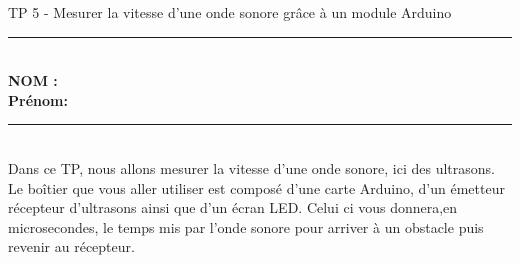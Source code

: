 \documentclass[11pt,a4paper]{article}
\begin{document}
\center \LARGE{TP 5 - Mesurer la vitesse d'une onde sonore grâce à un module Arduino}
\\[0,3cm]

\normalsize

\hrule\
\\[0,2cm]

\flushleft \textbf{NOM :\\
Prénom:\\[0,2cm]
}
\hrule\
\\[0,2cm]

Dans ce TP, nous allons mesurer la vitesse d'une onde sonore, ici des ultrasons. Le boîtier que vous aller utiliser est composé d'une carte Arduino, d'un émetteur récepteur d'ultrasons ainsi que d'un écran LED. Celui ci vous donnera,en microsecondes, le temps mis par l'onde sonore pour arriver à un obstacle puis revenir au récepteur. 

\ding{1}
\end{document}
